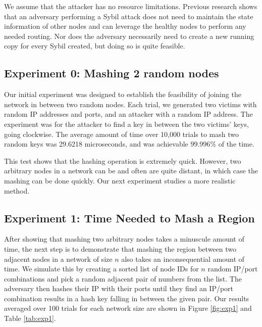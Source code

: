 \documentclass[11pt,conference]{IEEEtran}
\begin{document}
We assume that the attacker has no resource limitations.
Previous research \cite{sybilbit} shows that an adversary performing a Sybil attack does not need to maintain the state information of other nodes and can leverage the healthy nodes to perform any needed routing.
Nor does the adversary necessarily need to create a new running copy for every Sybil created, but doing so is quite feasible. 






\subsection{Experiment 0: Mashing 2 random nodes}
Our initial experiment was designed to establish the feasibility of joining the network in between two random nodes.
Each trial, we generated two victims with random IP addresses and ports, and an attacker with a random IP address.
The experiment was for the attacker to find a key in between the two victims' keys, going clockwise.
The average amount of time over 10,000 trials to mash two random keys was 29.6218 microseconds, and was achievable $ 99.996\%$ of the time.

This test shows that the hashing operation is extremely quick.
However, two arbitrary nodes in a network can be and often are quite distant, in which case the mashing can be done quickly.
Our next experiment studies a more realistic method.


\subsection{Experiment 1:  Time Needed to Mash a Region}
\label{sec:exp1}
After showing that mashing two arbitrary nodes takes a minuscule amount of time, the next step is to demonstrate that mashing the region between two adjacent nodes in a network of size $n$ also takes an inconsequential amount of time.
We simulate this by creating a sorted list of node IDs for $n$ random IP/port combinations and pick a random adjacent pair of numbers from the list.
The adversary then hashes their IP with their ports until they find an IP/port combination results in a hash key falling in between the given pair.
Our results averaged over 100 trials for each network size are shown in Figure \ref{fig:exp1} and Table \ref{tab:exp1}.
\end{document}
